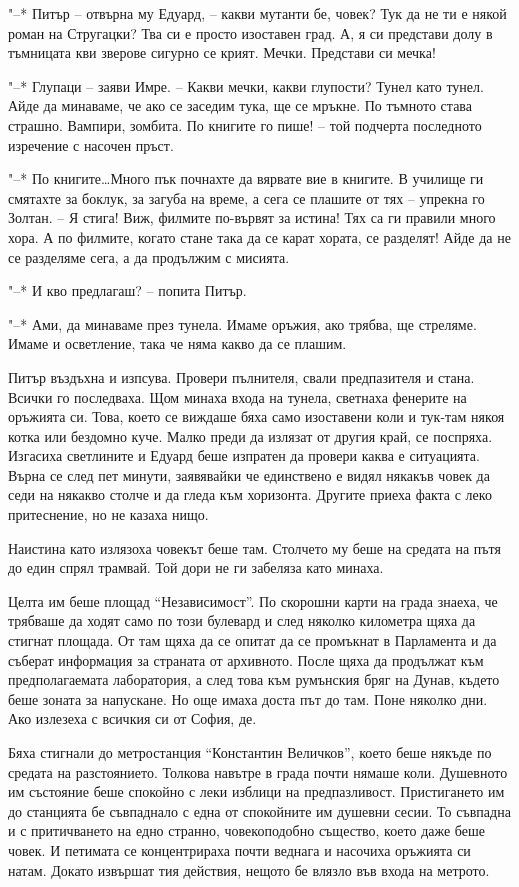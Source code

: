 \documentclass[ebook,openany,12pt]{memoir}
\begin{document}
"--* Питър -- отвърна му Едуард, – какви мутанти бе, човек? Тук да не ти е някой роман на Стругацки? Тва си е просто изоставен град. А, я си представи долу в тъмницата кви зверове сигурно се крият. Мечки. Представи си мечка!

"--* Глупаци – заяви Имре. – Какви мечки, какви глупости? Тунел като тунел. Айде да минаваме, че ако се заседим тука, ще се мръкне. По тъмното става страшно. Вампири, зомбита. По книгите го пише! – той подчерта последното изречение с насочен пръст.

"--* По книгите\ldots Много пък почнахте да вярвате вие в книгите. В училище ги смятахте за боклук, за загуба на време, а сега се плашите от тях – упрекна го Золтан. – Я стига! Виж, филмите по-вървят за истина! Тях са ги правили много хора. А по филмите, когато стане така да се карат хората, се разделят! Айде да не се разделяме сега, а да продължим с мисията.

"--* И кво предлагаш? – попита Питър.

"--* Ами, да минаваме през тунела. Имаме оръжия, ако трябва, ще стреляме. Имаме и осветление, така че няма какво да се плашим.

Питър въздъхна и изпсува. Провери пълнителя, свали предпазителя и стана. Всички го последваха. Щом минаха входа на тунела, светнаха фенерите на оръжията си. Това, което се виждаше бяха само изоставени коли и тук-там някоя котка или бездомно куче. Малко преди да излязат от другия край, се поспряха. Изгасиха светлините и Едуард беше изпратен да провери каква е ситуацията. Върна се след пет минути, заявявайки че единствено е видял някакъв човек да седи на някакво столче и да гледа към хоризонта. Другите приеха факта с леко притеснение, но не казаха нищо.

Наистина като излязоха човекът беше там. Столчето му беше на средата на пътя до един спрял трамвай. Той дори не ги забеляза като минаха.

Целта им беше площад ``Независимост''. По скорошни карти на града знаеха, че трябваше да ходят само по този булевард и след няколко километра щяха да стигнат площада. От там щяха да се опитат да се промъкнат в Парламента и да съберат информация за страната от архивното. После щяха да продължат към предполагаемата лаборатория, а след това към румънския бряг на Дунав, където беше зоната за напускане. Но още имаха доста път до там. Поне няколко дни. Ако излезеха с всичкия си от София, де.

Бяха стигнали до метростанция ``Константин Величков'', което беше някъде по средата на разстоянието. Толкова навътре в града почти нямаше коли. Душевното им състояние беше спокойно с леки изблици на предпазливост. Пристигането им до станцията бе съвпаднало с една от спокойните им душевни сесии. То съвпадна и с притичването на едно странно, човекоподобно същество, което даже беше човек. И петимата се концентрираха почти веднага и насочиха оръжията си натам. Докато извършат тия действия, нещото бе влязло във входа на метрото.
\end{document}
